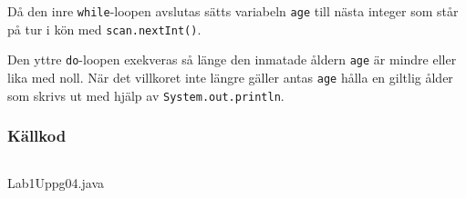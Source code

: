 Då den inre \texttt{while}-loopen avslutas sätts variabeln \texttt{age} till 
nästa integer som står på tur i kön med \texttt{scan.nextInt()}.
\par Den yttre \texttt{do}-loopen exekveras så länge den inmatade åldern \texttt{age}
är mindre eller lika med noll. När det villkoret inte längre gäller antas \texttt{age}
hålla en giltlig ålder som skrivs ut med hjälp av \texttt{System.out.println}.

\subsubsection{Källkod}\label{uppgift-4_src}
    \inputminted[linenos]{java}{src/Lab1Uppg04.java}
    \caption{Lab1Uppg04.java}
    \label{Uppg4src}
